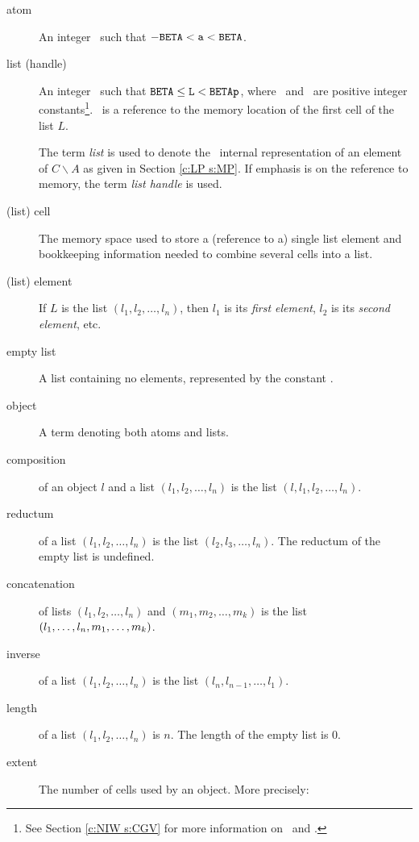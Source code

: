 \begin{description}
\item[atom]
  An integer \tta\ such that $-{\tt BETA} < {\tt a} < {\tt BETA}$.
\item[list (handle)]
  An integer \ttL\ such that ${\tt BETA} \leq {\tt L} < {\tt BETAp}$, where \BETA\ and
  \BETAp\ are positive integer constants\footnote{
    See Section \ref{c:NIW s:CGV} for more information on \BETA\ and \BETAp.
  }.
  \ttL\ is a reference to the memory location of the first cell of the
  list $L$.

  The term {\em list} is used to denote the \saclib\ internal
  representation of an element of $C \backslash\! A$ as given in Section
  \ref{c:LP s:MP}. If emphasis is on the reference to memory, the term {\em
  list handle} is used.
\item[(list) cell]
  The memory space used to store a (reference to a) single list element and
  bookkeeping information needed to combine several cells into a list.
\item[(list) element]
  If $L$ is the list $(l_1, l_2, \ldots, l_n)$, then $l_1$ is its {\em
  first element}, $l_2$ is its {\em second element}, etc.
\item[empty list]\index{\NIL}
  A list containing no elements, represented by the constant \NIL.
\item[object]
  A term denoting both atoms and lists.
\item[composition]
  of an object $l$ and a list $(l_1, l_2, \ldots, l_n)$ is the list $(l,
  l_1, l_2, \ldots, l_n)$.
\item[reductum]
  of a list $(l_1, l_2, \ldots, l_n)$ is the list $(l_2, l_3, \ldots,
  l_n)$. The reductum of the empty list is undefined.
\item[concatenation]
  of lists $(l_1, l_2, \ldots, l_n)$ and $(m_1, m_2, \ldots, m_k)$ is
  the list $(l_1, \ldots,\\l_n, m_1, \ldots, m_k)$.
\item[inverse]
  of a list $(l_1, l_2, \ldots, l_n)$ is the list $(l_n, l_{n-1}, \ldots,
  l_1)$.
\item[length]
  of a list $(l_1,l_2,\ldots,l_n)$ is $n$. The length of the empty list is 0.
\item[extent]
  The number of cells used by an object. More precisely:

\end{description}
